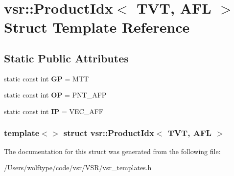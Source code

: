 \hypertarget{structvsr_1_1_product_idx_3_01_t_v_t_00_01_a_f_l_01_4}{\section{vsr\-:\-:Product\-Idx$<$ T\-V\-T, A\-F\-L $>$ Struct Template Reference}
\label{structvsr_1_1_product_idx_3_01_t_v_t_00_01_a_f_l_01_4}
}
\subsection*{Static Public Attributes}
\begin{DoxyCompactItemize}
\item 
\hypertarget{structvsr_1_1_product_idx_3_01_t_v_t_00_01_a_f_l_01_4_a1f331628b56f771f303423548ad6ba77}{static const int {\bfseries G\-P} = M\-T\-T}\label{structvsr_1_1_product_idx_3_01_t_v_t_00_01_a_f_l_01_4_a1f331628b56f771f303423548ad6ba77}

\item 
\hypertarget{structvsr_1_1_product_idx_3_01_t_v_t_00_01_a_f_l_01_4_a4a82e32f32fd84f9bc8c6a6caf9eea0a}{static const int {\bfseries O\-P} = P\-N\-T\-\_\-\-A\-F\-P}\label{structvsr_1_1_product_idx_3_01_t_v_t_00_01_a_f_l_01_4_a4a82e32f32fd84f9bc8c6a6caf9eea0a}

\item 
\hypertarget{structvsr_1_1_product_idx_3_01_t_v_t_00_01_a_f_l_01_4_a1bd4e116c3149801f6e1c1c041529eeb}{static const int {\bfseries I\-P} = V\-E\-C\-\_\-\-A\-F\-F}\label{structvsr_1_1_product_idx_3_01_t_v_t_00_01_a_f_l_01_4_a1bd4e116c3149801f6e1c1c041529eeb}

\end{DoxyCompactItemize}
\subsubsection*{template$<$$>$ struct vsr\-::\-Product\-Idx$<$ T\-V\-T, A\-F\-L $>$}



The documentation for this struct was generated from the following file\-:\begin{DoxyCompactItemize}
\item 
/\-Users/wolftype/code/vsr/\-V\-S\-R/vsr\-\_\-templates.\-h\end{DoxyCompactItemize}
